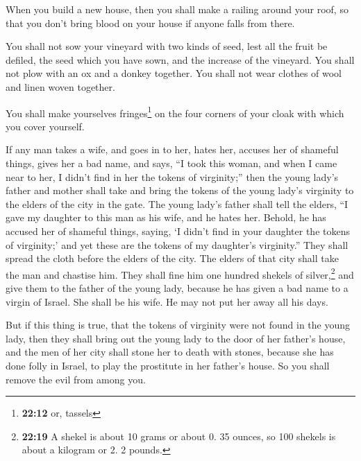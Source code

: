  When you build a new house, then you shall make a railing
around your roof, so that you don't bring blood on your house if anyone
falls from there.

 You shall not sow your vineyard with two kinds of seed,
lest all the fruit be defiled, the seed which you have sown, and the
increase of the vineyard.  You shall not plow with an ox
and a donkey together.  You shall not wear clothes of
wool and linen woven together.

 You shall make yourselves fringes\footnote{\textbf{22:12}
  or, tassels} on the four corners of your cloak with which you cover
yourself.

 If any man takes a wife, and goes in to her, hates her,
 accuses her of shameful things, gives her a bad name,
and says, ``I took this woman, and when I came near to her, I didn't
find in her the tokens of virginity;''  then the young
lady's father and mother shall take and bring the tokens of the young
lady's virginity to the elders of the city in the gate. 
The young lady's father shall tell the elders, ``I gave my daughter to
this man as his wife, and he hates her.  Behold, he has
accused her of shameful things, saying, `I didn't find in your daughter
the tokens of virginity;' and yet these are the tokens of my daughter's
virginity.'' They shall spread the cloth before the elders of the city.
 The elders of that city shall take the man and chastise
him.  They shall fine him one hundred shekels of
silver,\footnote{\textbf{22:19} A shekel is about 10 grams or about 0.
  35 ounces, so 100 shekels is about a kilogram or 2. 2 pounds.} and
give them to the father of the young lady, because he has given a bad
name to a virgin of Israel. She shall be his wife. He may not put her
away all his days.

 But if this thing is true, that the tokens of virginity
were not found in the young lady,  then they shall bring
out the young lady to the door of her father's house, and the men of her
city shall stone her to death with stones, because she has done folly in
Israel, to play the prostitute in her father's house. So you shall
remove the evil from among you.

